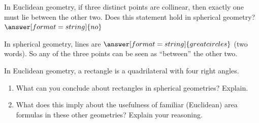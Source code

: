 \documentclass{ximera}
\begin{document}
\begin{problem} %
In Euclidean geometry, if three distinct points are collinear, then exactly one must lie between the other two.  Does this statement hold in spherical geometry? 
$\answer[format=string]{no}$

\begin{problem}

In spherical geometry, lines are $\answer[format=string]{great circles}$ (two words).  So any of the three points can be seen as ``between'' the other two.  
\end{problem}
\end{problem}


\begin{problem}
In Euclidean geometry, a rectangle is a quadrilateral with four right angles. 
\begin{enumerate}
\item What can you conclude about rectangles in spherical geometries?  Explain.  
\item What does this imply about the usefulness of familiar (Euclidean) area formulas in these other geometries?  Explain your reasoning. 
\end{enumerate} 
\end{problem}

%
\end{document}
